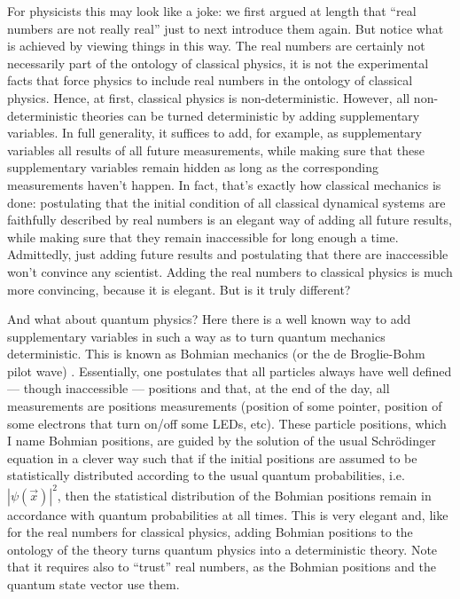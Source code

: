 \documentclass[floatfix,12pt]{article}
\begin{document}
For physicists this may look like a joke: we first argued at length that "`real numbers are not really real"' just to next introduce them again. But notice what is achieved by viewing things in this way. The real numbers are certainly not necessarily part of the ontology of classical physics, it is not the experimental facts that force physics to include real numbers in the ontology of classical physics. Hence, at first, classical physics is non-deterministic. However, all non-deterministic theories can be turned deterministic by adding supplementary variables. In full generality, it suffices to add, for example, as supplementary variables all results of all future measurements, while making sure that these supplementary variables remain hidden as long as the corresponding measurements haven't happen. In fact, that's exactly how classical mechanics is done: postulating that the initial condition of all classical dynamical systems are faithfully described by real numbers is an elegant way of adding all future results, while making sure that they remain inaccessible for long enough a time. Admittedly, just adding future results and postulating that there are inaccessible won't convince any scientist. Adding the real numbers to classical physics is much more convincing, because it is elegant. But is it truly different? 

And what about quantum physics? Here there is a well known way to add supplementary variables in such a way as to turn quantum mechanics deterministic. This is known as Bohmian mechanics (or the de Broglie-Bohm pilot wave) \cite{Bohm52,BellBohm,DurrTeufel}. Essentially, one postulates that all particles always have well defined --- though inaccessible --- positions and that, at the end of the day, all measurements are positions measurements (position of some pointer, position of some electrons that turn on/off some LEDs, etc). These particle positions, which I name Bohmian positions, are guided by the solution of the usual Schr\"odinger equation in a clever way such that if the initial positions are assumed to be statistically distributed according to the usual quantum probabilities, i.e. $|\psi(\vec x)|^2$, then the statistical distribution of the Bohmian positions remain in accordance with quantum probabilities at all times. This is very elegant and, like for the real numbers for classical physics, adding Bohmian positions to the ontology of the theory turns quantum physics into a deterministic theory. Note that it requires also to ``trust'' real numbers, as the Bohmian positions and the quantum state vector use them. 
\end{document}
